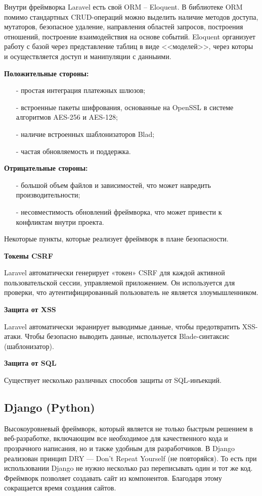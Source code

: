Внутри фреймворка Laravel есть свой ORM -- Eloquent. В библиотеке ORM помимо стандартных CRUD-операций можно выделить наличие методов доступа,
мутаторов, безопасное удаление, направления областей запросов, построения отношений, построение взаимодействия на основе событий. 
Eloquent организует работу с базой через представление таблиц в виде <<моделей>>, через которы и осуществляется доступ и манипуляции с данныими.

\textbf{Положительные стороны:}
\begin{itemize}
  \item[-] простая интеграция платежных шлюзов;
  \item[-] встроенные пакеты шифрования, основанные на OpenSSL в системе алгоритмов AES-256 и AES-128; 
  \item[-] наличие встроенных шаблонизаторов Blad;
  \item[-] частая обновляемость и поддержка.
\end{itemize}

\textbf{Отрицательные стороны:}
\begin{itemize}
  \item[-] большой объем файлов и зависимостей, что может навредить производительности;
  \item[-] несовместимость обновлений фреймворка, что может привести к конфликтам внутри проекта.
\end{itemize}
   
    
Некоторые пункты, которые реализует фреймворк в плане безопасности.

\textbf{Токены CSRF}

Laravel автоматически генерирует «токен» CSRF для каждой активной пользовательской сессии, управляемой приложением.
Он используется для проверки, что аутентифицированный пользователь не является злоумышленником.

\textbf{Защита от XSS}

Laravel автоматически экранирует выводимые данные, чтобы предотвратить XSS-атаки. Чтобы безопасно выводить данные, используется Blade-синтаксис (шаблонизатор).

\textbf{Защита от SQL}

Существует несколько различных способов защиты от SQL-инъекций.


\subsection{Django (Python)}
Высокоуровневый фреймворк, который является не только быстрым решением в веб-разработке, включающим все необходимое для 
качественного кода и прозрачного написания, но и также удобным для разработчиков.
В Django реализован принцип DRY — Don't Repeat Yourself (не повторяйся). То есть при использовании Django не нужно 
несколько раз переписывать один и тот же код. Фреймворк позволяет создавать сайт из компонентов. Благодаря этому сокращается 
время создания сайтов.

